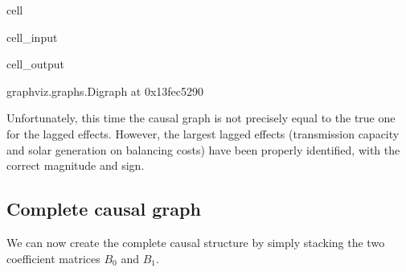\documentclass[letterpaper,10pt,english]{jupyterBook}
\begin{document}
\begin{sphinxuseclass}{cell}\begin{sphinxVerbatimInput}

\begin{sphinxuseclass}{cell_input}
\begin{sphinxVerbatim}[commandchars=\\\{\}]
  
\PYG{p}{[}\PYG{p}{]}  
\end{sphinxVerbatim}

\end{sphinxuseclass}\end{sphinxVerbatimInput}
\begin{sphinxVerbatimOutput}

\begin{sphinxuseclass}{cell_output}
\begin{sphinxVerbatim}[commandchars=\\\{\}]
\PYGZlt{}graphviz.graphs.Digraph at 0x13fec5290\PYGZgt{}
\end{sphinxVerbatim}

\end{sphinxuseclass}\end{sphinxVerbatimOutput}

\end{sphinxuseclass}
\sphinxAtStartPar
Unfortunately, this time the causal graph is not precisely equal to the true one for the lagged effects. However, the largest lagged effects (transmission capacity and solar generation on balancing costs) have been properly identified, with the correct magnitude and sign.


\subsection{Complete causal graph}
\label{\detokenize{notebooks/semiparametric_varlingam:complete-causal-graph}}
\sphinxAtStartPar
We can now create the complete causal structure by simply stacking the two coefficient matrices \(B_0\) and \(B_1\).
\end{document}
